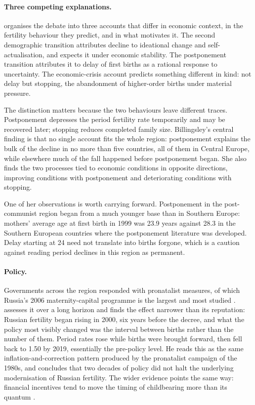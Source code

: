 \paragraph{Three competing explanations.} \textcite{billingsley2010} organises the debate into three accounts that differ in economic context, in the fertility behaviour they predict, and in what motivates it. The second demographic transition attributes decline to ideational change and self-actualisation, and expects it under economic stability. The postponement transition attributes it to delay of first births as a rational response to uncertainty. The economic-crisis account predicts something different in kind: not delay but stopping, the abandonment of higher-order births under material pressure.

The distinction matters because the two behaviours leave different traces. Postponement depresses the period fertility rate temporarily and may be recovered later; stopping reduces completed family size. Billingsley's central finding is that no single account fits the whole region: postponement explains the bulk of the decline in no more than five countries, all of them in Central Europe, while elsewhere much of the fall happened before postponement began. She also finds the two processes tied to economic conditions in opposite directions, improving conditions with postponement and deteriorating conditions with stopping.

One of her observations is worth carrying forward. Postponement in the post-communist region began from a much younger base than in Southern Europe: mothers' average age at first birth in 1999 was 23.9 years against 28.3 in the Southern European countries where the postponement literature was developed. Delay starting at 24 need not translate into births forgone, which is a caution against reading period declines in this region as permanent.

\paragraph{Policy.} Governments across the region responded with pronatalist measures, of which Russia's 2006 maternity-capital programme is the largest and most studied \parencite{brainerd2010}. \textcite{zakharov2024} assesses it over a long horizon and finds the effect narrower than its reputation: Russian fertility began rising in 2000, six years before the decree, and what the policy most visibly changed was the interval between births rather than the number of them. Period rates rose while births were brought forward, then fell back to 1.50 by 2019, essentially the pre-policy level. He reads this as the same inflation-and-correction pattern produced by the pronatalist campaign of the 1980s, and concludes that two decades of policy did not halt the underlying modernisation of Russian fertility. The wider evidence points the same way: financial incentives tend to move the timing of childbearing more than its quantum \parencite{gauthier2007}.

